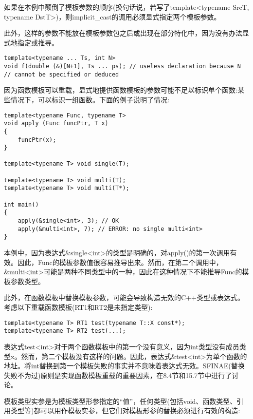 如果在本例中颠倒了模板参数的顺序(换句话说，若写了template<typename SrcT, typename DstT>)，则implicit\_cast的调用必须显式指定两个模板参数。

此外，这样的参数不能放在模板参数包之后或出现在部分特化中，因为没有办法显式地指定或推导。

\begin{lstlisting}[style=styleCXX]
template<typename ... Ts, int N>
void f(double (&)[N+1], Ts ... ps); // useless declaration because N
// cannot be specified or deduced
\end{lstlisting}

因为函数模板可以重载，显式地提供函数模板的参数可能不足以标识单个函数:某些情况下，可以标识一组函数。下面的例子说明了情况:

\begin{lstlisting}[style=styleCXX]
template<typename Func, typename T>
void apply (Func funcPtr, T x)
{
	funcPtr(x);
}

template<typename T> void single(T);

template<typename T> void multi(T);
template<typename T> void multi(T*);

int main()
{
	apply(&single<int>, 3); // OK
	apply(&multi<int>, 7); // ERROR: no single multi<int>
}
\end{lstlisting}

本例中，因为表达式\&single<int>的类型是明确的，对apply()的第一次调用有效。因此，Func的模板参数值很容易推导出来。然而，在第二个调用中，\&multi<int>可能是两种不同类型中的一种，因此在这种情况下不能推导Func的模板参数类型。

此外，在函数模板中替换模板参数，可能会导致构造无效的C++类型或表达式。考虑以下重载函数模板(RT1和RT2是未指定类型):

\begin{lstlisting}[style=styleCXX]
template<typename T> RT1 test(typename T::X const*);
template<typename T> RT2 test(...);
\end{lstlisting}

表达式test<int>对于两个函数模板中的第一个没有意义，因为int类型没有成员类型x。然而，第二个模板没有这样的问题。因此，表达式\&test<int>为单个函数的地址。将int替换到第一个模板失败的事实并不意味着表达式无效。SFINAE(替换失败不为过)原则是实现函数模板重载的重要因素，在8.4节和15.7节中进行了讨论。


模板类型实参是为模板类型形参指定的“值”，任何类型(包括void、函数类型、引用类型等)都可以用作模板实参，但它们对模板形参的替换必须进行有效的构造:

